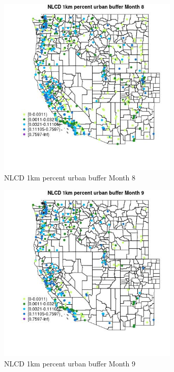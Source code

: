 \begin{figure} 
\centering  
\includegraphics[width=0.77\textwidth]{Code_Outputs/Report_ML_input_PM25_Step4_part_e_de_duplicated_aves_compiled_2019-05-18wNAs_MapObsMo8NLCD_1km_percent_urban_buffer.jpg} 
\caption{\label{fig:Report_ML_input_PM25_Step4_part_e_de_duplicated_aves_compiled_2019-05-18wNAsMapObsMo8NLCD_1km_percent_urban_buffer}NLCD 1km percent urban buffer Month 8} 
\end{figure} 
 

\begin{figure} 
\centering  
\includegraphics[width=0.77\textwidth]{Code_Outputs/Report_ML_input_PM25_Step4_part_e_de_duplicated_aves_compiled_2019-05-18wNAs_MapObsMo9NLCD_1km_percent_urban_buffer.jpg} 
\caption{\label{fig:Report_ML_input_PM25_Step4_part_e_de_duplicated_aves_compiled_2019-05-18wNAsMapObsMo9NLCD_1km_percent_urban_buffer}NLCD 1km percent urban buffer Month 9} 
\end{figure} 
 

